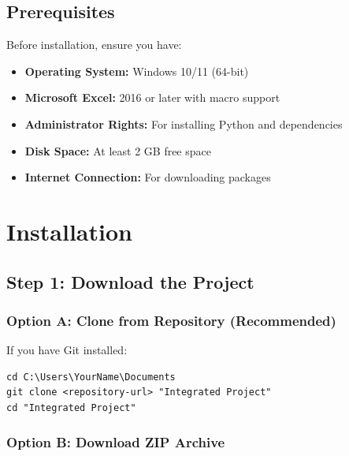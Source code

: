 \documentclass[11pt,a4paper]{article}
\begin{document}
\subsection{Prerequisites}

Before installation, ensure you have:

\begin{itemize}[leftmargin=*]
    \item \textbf{Operating System:} Windows 10/11 (64-bit)
    \item \textbf{Microsoft Excel:} 2016 or later with macro support
    \item \textbf{Administrator Rights:} For installing Python and dependencies
    \item \textbf{Disk Space:} At least 2 GB free space
    \item \textbf{Internet Connection:} For downloading packages
\end{itemize}

\newpage

\section{Installation}

\subsection{Step 1: Download the Project}

\subsubsection{Option A: Clone from Repository (Recommended)}

If you have Git installed:

\begin{commandbox}[title=Git Clone Command]
\begin{lstlisting}[style=shellstyle]
cd C:\Users\YourName\Documents
git clone <repository-url> "Integrated Project"
cd "Integrated Project"
\end{lstlisting}
\end{commandbox}

\subsubsection{Option B: Download ZIP Archive}
\end{document}
